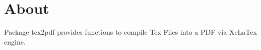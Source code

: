 \section{About}

Package tex2pdf provides functions to compile Tex Files into a PDF via XeLaTex engine.

